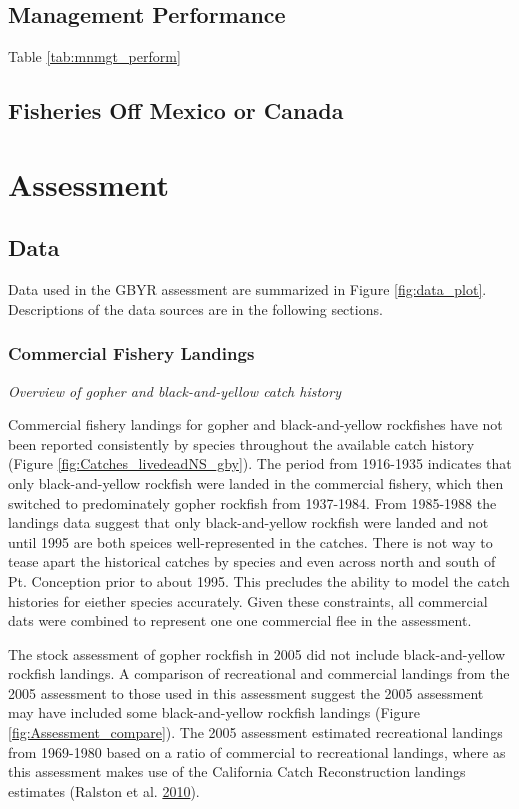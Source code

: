 \documentclass[12pt,]{article}
\begin{document}
\subsection{Management Performance}\label{management-performance-1}

Table \ref{tab:mnmgt_perform}

\subsection{Fisheries Off Mexico or
Canada}\label{fisheries-off-mexico-or-canada}

\section{Assessment}\label{assessment}

\subsection{Data}\label{data}

Data used in the GBYR assessment are summarized in Figure
\ref{fig:data_plot}. Descriptions of the data sources are in the
following sections.

\subsubsection{Commercial Fishery
Landings}\label{commercial-fishery-landings}

\emph{Overview of gopher and black-and-yellow catch history}

Commercial fishery landings for gopher and black-and-yellow rockfishes
have not been reported consistently by species throughout the available
catch history (Figure \ref{fig:Catches_livedeadNS_gby}). The period from
1916-1935 indicates that only black-and-yellow rockfish were landed in
the commercial fishery, which then switched to predominately gopher
rockfish from 1937-1984. From 1985-1988 the landings data suggest that
only black-and-yellow rockfish were landed and not until 1995 are both
speices well-represented in the catches. There is not way to tease apart
the historical catches by species and even across north and south of Pt.
Conception prior to about 1995. This precludes the ability to model the
catch histories for eiether species accurately. Given these constraints,
all commercial dats were combined to represent one one commercial flee
in the assessment.

The stock assessment of gopher rockfish in 2005 did not include
black-and-yellow rockfish landings. A comparison of recreational and
commercial landings from the 2005 assessment to those used in this
assessment suggest the 2005 assessment may have included some
black-and-yellow rockfish landings (Figure
\ref{fig:Assessment_compare}). The 2005 assessment estimated
recreational landings from 1969-1980 based on a ratio of commercial to
recreational landings, where as this assessment makes use of the
California Catch Reconstruction landings estimates (Ralston et al.
\protect\hyperlink{ref-Ralston2010}{2010}).
\end{document}

